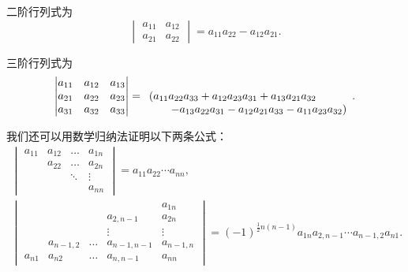 二阶行列式为
\begin{equation}
	\begin{vmatrix}
		a_{11} & a_{12} \\
		a_{21} & a_{22}
	\end{vmatrix}
	= a_{11} a_{22} - a_{12} a_{21}.
\end{equation}

三阶行列式为
\begin{equation}
	\begin{vmatrix}
		a_{11} & a_{12} & a_{13} \\
		a_{21} & a_{22} & a_{23} \\
		a_{31} & a_{32} & a_{33}
	\end{vmatrix}
	= \begin{array}[t]{l}
		(a_{11} a_{22} a_{33} + a_{12} a_{23} a_{31} + a_{13} a_{21} a_{32} \\
		\hspace{20pt}
		- a_{13} a_{22} a_{31} - a_{12} a_{21} a_{33} - a_{11} a_{23} a_{32})
	\end{array}.
\end{equation}

我们还可以用数学归纳法证明以下两条公式：
\begin{gather}
\begin{vmatrix}
a_{11} & a_{12} & \dots & a_{1n} \\
& a_{22} & \dots & a_{2n} \\
& & \ddots & \vdots \\
& & & a_{nn}
\end{vmatrix}
= a_{11} a_{22} \dotsm a_{nn}, \\
\begin{vmatrix}
& & & & a_{1n} \\
& & & a_{2,n-1} & a_{2n} \\
& & & \vdots & \vdots \\
& a_{n-1,2} & \dots & a_{n-1,n-1} & a_{n-1,n} \\
a_{n1} & a_{n2} & \dots & a_{n,n-1} & a_{nn}
\end{vmatrix}
=(-1)^{\frac{1}{2}n(n-1)} a_{1n} a_{2,n-1} \dotsm a_{n-1,2} a_{n1}.
\end{gather}


